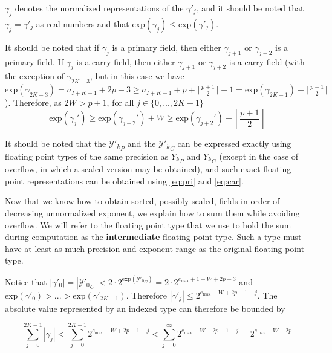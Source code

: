\documentclass[12pt]{article}
\providecommand{\exp}{\ensuremath{\text{exp}}}
\providecommand{\max}{\ensuremath{\text{max}}}
\theoremstyle{definition}
\numberwithin{equation}{section}
\numberwithin{figure}{section}
\begin{document}
    $\gamma_j$ denotes the normalized representations of the $\gamma'_j$, and it should be noted that $\gamma_j = \gamma'_j$ as real numbers and that $\exp(\gamma_j) \leq \exp(\gamma'_j)$.

    It should be noted that if $\gamma_j$ is a primary field, then either $\gamma_{j + 1}$ or $\gamma_{j + 2}$ is a primary field. If $\gamma_j$ is a carry field, then either $\gamma_{j + 1}$ or $\gamma_{j + 2}$ is a carry field (with the exception of $\gamma_{2  K - 3}$, but in this case we have $\exp(\gamma_{2  K - 3}) = a_{I + K - 1} + 2  p - 3 \geq a_{I + K - 1} + p + \lceil\frac{p + 1}{2}\rceil - 1 = \exp(\gamma_{2  K - 1}) + \lceil\frac{p + 1}{2}\rceil$). Therefore, as $2  W > p + 1$, for all $j \in \{0, ..., 2  K - 1\}$
    \begin{equation}
      \exp(\gamma_j') \geq \exp(\gamma_{j + 2}') + W \geq \exp(\gamma_{j + 2}') + \left\lceil\frac{p + 1}{2}\right\rceil
      \label{eq:gammadecreasesfast}
    \end{equation}

    It should be noted that the ${\mathcal{Y}'_k}_P$ and the ${\mathcal{Y}'_k}_C$ can be expressed exactly using floating point types of the same precision as ${Y_k}_P$ and ${Y_k}_C$ (except in the case of overflow, in which a scaled version may be obtained), and such exact floating point representations can be obtained using  \eqref{eq:pri} and  \eqref{eq:car}.

    Now that we know how to obtain sorted, possibly scaled, fields in order of decreasing unnormalized exponent, we explain how to sum them while avoiding overflow. We will refer to the floating point type that we use to hold the sum during computation as the \textbf{intermediate} floating point type. Such a type must have at least as much precision and exponent range as the original floating point type.

    Notice that $|\gamma'_0| = |{\mathcal{Y}'_0}_C| < 2 \cdot 2^{\exp({\mathcal{Y}'_0}_C)} = 2 \cdot 2^{e_{\max} + 1 - W + 2  p - 3}$ and $\exp(\gamma'_0) > ... > \exp(\gamma'_{2  K - 1})$.  Therefore $|\gamma'_j| \leq 2^{e_{\max} - W + 2  p - 1 - j}$. The absolute value represented by an indexed type can therefore be bounded by

    \begin{equation}
      \label{eq:maxindexedvalue}
      \sum\limits_{j = 0}^{2  K - 1} |\gamma_j| < \sum\limits_{j = 0}^{2  K - 1} 2^{e_{\max} - W + 2  p - 1 - j} < \sum\limits_{j = 0}^{\infty} 2^{e_{\max} - W + 2  p - 1 - j} = 2^{e_{\max} - W + 2  p}
    \end{equation}
\end{document}
